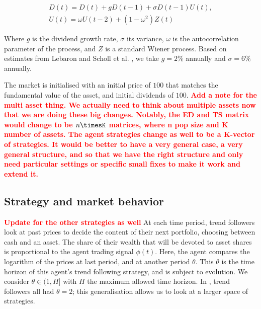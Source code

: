 \documentclass{article}
\newcommand\boldred[1]{\textcolor{red}{\textbf{#1}}}
\begin{document}
\begin{equation}
    \label{dividend_equation}
    \begin{array}{l}
{D}(t)={D}(t)+g {D}(t-1)+\sigma {D}(t-1) {U}(t), \\
{U}(t)=\omega U(t-2)+\left(1-\omega^{2}\right){Z}(t)
\end{array}
\end{equation}

Where $g$ is the dividend growth rate, $\sigma$ its variance, $\omega$ is the autocorrelation parameter of the process, and $Z$ is a standard Wiener process. Based on estimates from Lebaron \cite{lebaron2001empirical} and Scholl et al. \cite{scholl2020market}, we take $g=2\%$ annually and $\sigma = 6\%$ annually. \par
The market is initialised with an initial price of $100$ that matches the fundamental value of the asset, and initial dividends of $100$. 
\boldred{Add a note for the multi asset thing. We actually need to think about multiple assets now that we are doing these big changes. Notably, the ED and TS matrix would change to be $n\timesK$ matrices, where n pop size and K number of assets. The agent strategies change as well to be a K-vector of strategies. It would be better to have a very general case, a very general structure, and so that we have the right structure and only need particular settings or specific small fixes to make it work and extend it.}

\subsection{Strategy and market behavior}
\boldred{Update for the other strategies as well}
At each time period, trend followers look at past prices to decide the content of their next portfolio, choosing between cash and an asset. The share of their wealth that will be devoted to asset shares is proportional to the agent trading signal $\phi(t)$. Here, the agent compares the logarithm of the prices at last period, and at another period $\theta$. This $\theta$ is the time horizon of this agent's trend following strategy, and is subject to evolution. We consider $\theta \in (1, H]$ with $H$ the maximum allowed time horizon. In \cite{scholl2020market}, trend followers all had $\theta = 2$; this generalisation allows us to look at a larger space of strategies.
\end{document}
